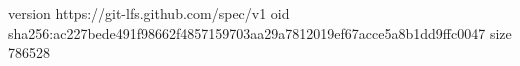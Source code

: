version https://git-lfs.github.com/spec/v1
oid sha256:ac227bede491f98662f4857159703aa29a7812019ef67acce5a8b1dd9ffc0047
size 786528
